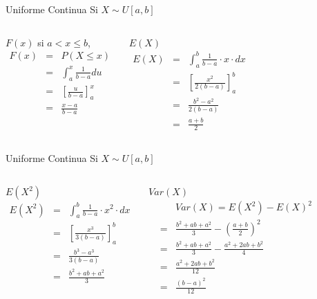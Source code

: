 \documentclass[11pt]{beamer}
\begin{document}
\begin{frame}{Uniforme Continua}
Si $X \sim U[a,b]$ 

\begin{columns}
\begin{block}{$F(x)$}
si $a < x \le b$,
\begin{eqnarray*}
F( x ) &=&  P(X \le x)  \\
       &=& \int_{a}^{x}{\frac{1}{b-a}du} \\
       &=& \left[ \frac{u}{b-a}\right]_a^x \\
       &=& \frac{x-a}{b-a} \\
\end{eqnarray*}

\end{block}
\begin{block}{$E(X)$}
\begin{eqnarray*}
E(X ) &=& \int_{a}^{b}{\frac{1}{b-a} \cdot x\cdot dx} \\
       &=& \left[ \frac{x^2}{2(b-a)}\right]_a^b \\
       &=& \frac{b^2 -a^2}{2(b-a)}  \\
       &=& \frac{a+b}{2} 
\end{eqnarray*}
\end{block}
\end{columns}
\end{frame}
\begin{frame}{Uniforme Continua}
Si $X \sim U[a,b]$ 
\begin{columns}
\begin{block}{$E(X^2)$}
\begin{eqnarray*}
 E(X^2) &=&\int_{a}^{b}{\frac{1}{b-a} \cdot x^2\cdot dx}\\
 &=&  \left[ \frac{x^3}{3(b-a)}\right]_a^b \\
&=& \frac{b^3 -a^3}{3(b-a)} \\
&=& \frac{b^2 + ab + a^2}{3}
\end{eqnarray*}
\end{block}
\begin{block}{$Var(X)$}
\begin{eqnarray*}
&& Var(X) = E(X^2)-E(X)^2 \\
&=& \frac{b^2 + ab + a^2}{3} -  \left(\frac{a+b}{2} \right)^2 \\
&=&  \frac{b^2 + ab + a^2}{3} -  \frac{a^2 +2ab+b^2}{4} \\
&=& \frac{a^2 + 2ab + b^2}{12} \\
&=& \frac{(b-a)^2}{12}
\end{eqnarray*}
\end{block}
\end{columns}


\end{frame}
\end{document}
